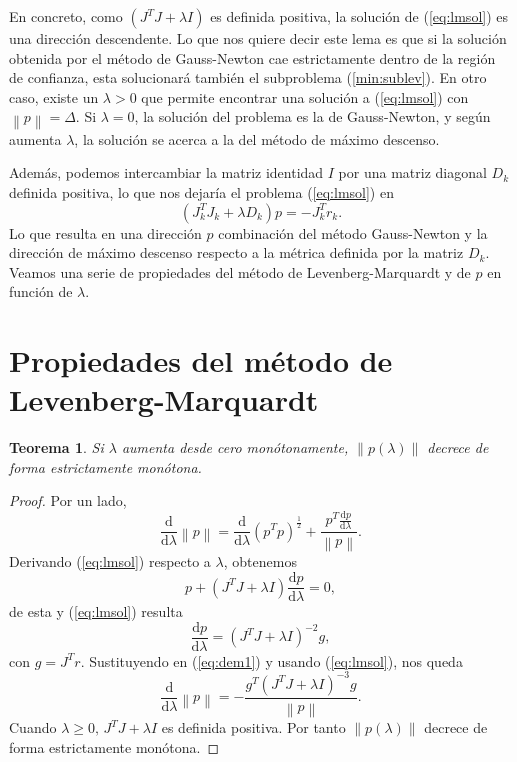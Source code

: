 \documentclass[11pt,a4paper]{book}
\newtheorem{theorem}{Teorema}[chapter]
\theoremstyle{definition}
\theoremstyle{remark}
\newcommand{\norm}[1]{\left\lVert#1\right\rVert}
\begin{document}
En concreto, como $(J^TJ+\lambda I)$ es definida positiva, la solución de (\ref{eq:lmsol}) es una dirección descendente. Lo que nos quiere decir este lema es que si la solución obtenida por el método de Gauss-Newton cae estrictamente dentro de la región de confianza, esta solucionará también el subproblema (\ref{min:sublev}).
En otro caso, existe un $\lambda>0$ que permite encontrar una solución a (\ref{eq:lmsol})
con $\norm{p}=\Delta$. Si $\lambda=0$, la solución del problema es la de Gauss-Newton, y según aumenta $\lambda$, la solución se acerca a la del método de máximo descenso.

Además, podemos intercambiar la matriz identidad $I$ por una matriz diagonal $D_k$ definida positiva, lo que nos dejaría el problema (\ref{eq:lmsol}) en
\begin{equation}
	(J_k^TJ_k+\lambda D_k)p = -J_k^Tr_k.
\end{equation}
Lo que resulta en una dirección $p$ combinación del método Gauss-Newton y la dirección de máximo descenso respecto a la métrica definida por la matriz $D_k$.
Veamos una serie de propiedades del método de Levenberg-Marquardt y de $p$ en función de $\lambda$. 

\section{Propiedades del método de Levenberg-Marquardt}
\begin{theorem}
	Si $\lambda$ aumenta desde cero monótonamente, $\norm{p(\lambda)}$ decrece de forma estrictamente monótona.
\end{theorem}
\begin{proof}
	Por un lado,
	\begin{equation}
		\label{eq:dem1}
		\frac{\mathrm{d}}{\mathrm{d}\lambda}\norm{p}=
		\frac{\mathrm{d}}{\mathrm{d}\lambda}(p^Tp)^{\frac{1}{2}}+
		\frac{p^T\frac{\mathrm{d}p}{\mathrm{d}\lambda}}{\norm{p}}.
	\end{equation}
	Derivando (\ref{eq:lmsol}) respecto a $\lambda$, obtenemos
	\begin{equation}
		\label{eq:dem2}
		p + (J^TJ+\lambda I)\frac{\mathrm{d}p}{\mathrm{d}\lambda} = 0,
	\end{equation}
	de esta y (\ref{eq:lmsol}) resulta
	\begin{equation}
		\label{eq:dem3}
		\frac{\mathrm{d}p}{\mathrm{d}\lambda}=(J^TJ+\lambda I)^{-2}g,
	\end{equation}
	con $g=J^Tr$. Sustituyendo en (\ref{eq:dem1}) y usando (\ref{eq:lmsol}), nos queda
	\begin{equation}
		\frac{\mathrm{d}}{\mathrm{d}\lambda}\norm{p}=
		-\frac{g^T(J^TJ+\lambda I)^{-3}g}{\norm{p}}.
	\end{equation}
	Cuando $\lambda \geq 0,\, J^TJ+\lambda I$ es definida positiva. Por tanto $\norm{p(\lambda)}$ 
	decrece de forma estrictamente monótona.
\end{proof}
\end{document}
